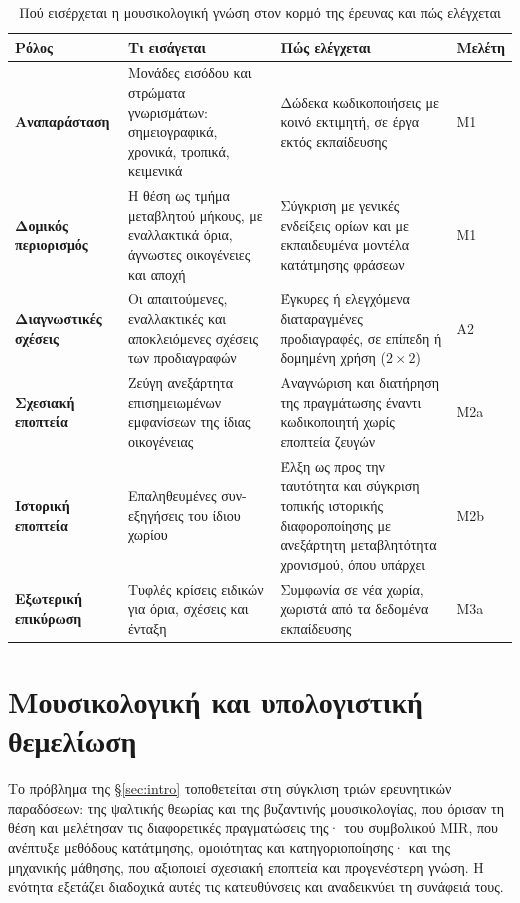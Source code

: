 \documentclass[a4paper]{article}
\begin{document}
\begin{table}[htbp]
\caption{Πού εισέρχεται η μουσικολογική γνώση στον κορμό της έρευνας και πώς ελέγχεται}\label{tab:knowledge}
\footnotesize
\begin{tabularx}{\linewidth}{@{}>{\bfseries}L{2.5cm}YYL{1.15cm}@{}}
\toprule
Ρόλος & \textbf{Τι εισάγεται} & \textbf{Πώς ελέγχεται} & \textbf{Μελέτη}\\\midrule
Αναπαράσταση & Μονάδες εισόδου και στρώματα γνωρισμάτων: σημειογραφικά, χρονικά, τροπικά, κειμενικά & Δώδεκα κωδικοποιήσεις με κοινό εκτιμητή, σε έργα εκτός εκπαίδευσης & Μ1\\
Δομικός περιορισμός & Η θέση ως τμήμα μεταβλητού μήκους, με εναλλακτικά όρια, άγνωστες οικογένειες και αποχή & Σύγκριση με γενικές ενδείξεις ορίων και με εκπαιδευμένα μοντέλα κατάτμησης φράσεων & Μ1\\
Διαγνωστικές σχέσεις & Οι απαιτούμενες, εναλλακτικές και αποκλειόμενες σχέσεις των προδιαγραφών & Έγκυρες ή ελεγχόμενα διαταραγμένες προδιαγραφές, σε επίπεδη ή δομημένη χρήση ($2\times2$) & Α2\\
Σχεσιακή εποπτεία & Ζεύγη ανεξάρτητα επισημειωμένων εμφανίσεων της ίδιας οικογένειας & Αναγνώριση και διατήρηση της πραγμάτωσης έναντι κωδικοποιητή χωρίς εποπτεία ζευγών & Μ2a\\
Ιστορική εποπτεία & Επαληθευμένες συν-εξηγήσεις του ίδιου χωρίου & Έλξη ως προς την ταυτότητα και σύγκριση τοπικής ιστορικής διαφοροποίησης με ανεξάρτητη μεταβλητότητα χρονισμού, όπου υπάρχει & Μ2b\\
Εξωτερική επικύρωση & Τυφλές κρίσεις ειδικών για όρια, σχέσεις και ένταξη & Συμφωνία σε νέα χωρία, χωριστά από τα δεδομένα εκπαίδευσης & Μ3a\\\bottomrule
\end{tabularx}
\end{table}

\section{Μουσικολογική και υπολογιστική θεμελίωση}\label{sec:theory}
Το πρόβλημα της §\ref{sec:intro} τοποθετείται στη σύγκλιση τριών ερευνητικών παραδόσεων: της ψαλτικής θεωρίας και της βυζαντινής μουσικολογίας, που όρισαν τη θέση και μελέτησαν τις διαφορετικές πραγματώσεις της· του συμβολικού MIR, που ανέπτυξε μεθόδους κατάτμησης, ομοιότητας και κατηγοριοποίησης· και της μηχανικής μάθησης, που αξιοποιεί σχεσιακή εποπτεία και προγενέστερη γνώση. Η ενότητα εξετάζει διαδοχικά αυτές τις κατευθύνσεις και αναδεικνύει τη συνάφειά τους.
\end{document}
